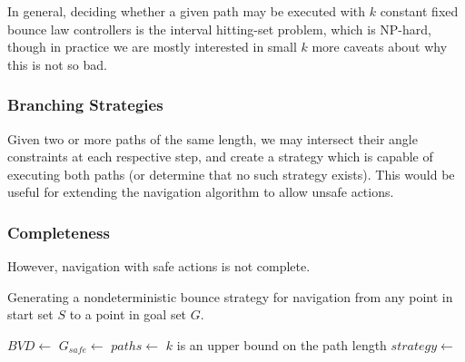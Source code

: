 \documentclass[]{styles/svproc}  %
\begin{document}
In general, deciding whether a given path may be
executed with $k$ constant fixed bounce law controllers is the interval
hitting-set problem, which is NP-hard, though in practice we are mostly
interested in small $k$ {\color{red} more caveats about why this is not so bad}.

\subsubsection{Branching Strategies}

Given two or more paths of the same length, we may intersect their angle
constraints at each respective step, and create a strategy which is capable of
executing both paths (or determine that no such strategy exists). This would be
useful for extending the navigation algorithm to allow unsafe actions. 

\subsubsection{Completeness}

However, navigation with safe actions is not complete.


%


%

\begin{algorithm}
\caption{Generating a nondeterministic bounce strategy for navigation from any
point in start set $S$ to a point in goal set $G$.}
\label{algo:nav}

\begin{algorithmic}
\State $BVD \gets$ 
\State $G_{safe} \gets$ 
\State $paths \gets$ 
\Comment $k$ is an upper bound on the path length
\State $strategy \gets$ 
\EndProcedure
\end{algorithmic}
\end{algorithm}
\end{document}
